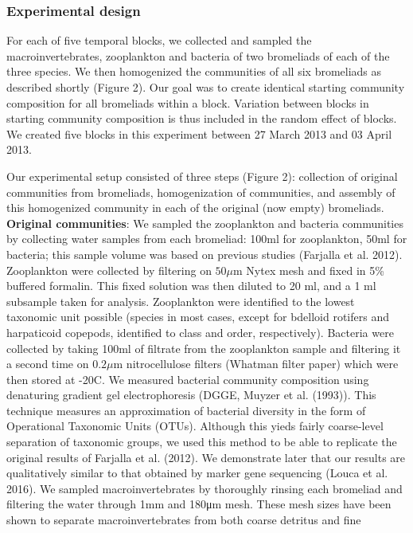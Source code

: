 \documentclass[12pt,]{article}
\begin{document}
\subsubsection{Experimental design}\label{experimental-design}

For each of five temporal blocks, we collected and sampled the
macroinvertebrates, zooplankton and bacteria of two bromeliads of each
of the three species. We then homogenized the communities of all six
bromeliads as described shortly (Figure 2). Our goal was to create
identical starting community composition for all bromeliads within a
block. Variation between blocks in starting community composition is
thus included in the random effect of blocks. We created five blocks in
this experiment between 27 March 2013 and 03 April 2013.

Our experimental setup consisted of three steps (Figure 2): collection
of original communities from bromeliads, homogenization of communities,
and assembly of this homogenized community in each of the original (now
empty) bromeliads. \textbf{Original communities}: We sampled the
zooplankton and bacteria communities by collecting water samples from
each bromeliad: 100ml for zooplankton, 50ml for bacteria; this sample
volume was based on previous studies (Farjalla et al. 2012). Zooplankton
were collected by filtering on \(50\mu\)m Nytex mesh and fixed in 5\%
buffered formalin. This fixed solution was then diluted to 20 ml, and a
1 ml subsample taken for analysis. Zooplankton were identified to the
lowest taxonomic unit possible (species in most cases, except for
bdelloid rotifers and harpaticoid copepods, identified to class and
order, respectively). Bacteria were collected by taking 100ml of
filtrate from the zooplankton sample and filtering it a second time on
\(0.2\mu\)m nitrocellulose filters (Whatman filter paper) which were
then stored at -20C. We measured bacterial community composition using
denaturing gradient gel electrophoresis (DGGE, Muyzer et al. (1993)).
This technique measures an approximation of bacterial diversity in the
form of Operational Taxonomic Units (OTUs). Although this yieds fairly
coarse-level separation of taxonomic groups, we used this method to be
able to replicate the original results of Farjalla et al. (2012). We
demonstrate later that our results are qualitatively similar to that
obtained by marker gene sequencing (Louca et al. 2016). We sampled
macroinvertebrates by thoroughly rinsing each bromeliad and filtering
the water through 1mm and 180μm mesh. These mesh sizes have been shown
to separate macroinvertebrates from both coarse detritus and fine
\end{document}

